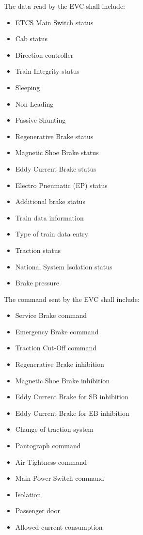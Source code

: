\documentclass{template/openetcs_article}
\begin{document}
		The data read by the EVC shall include:
		\begin{itemize}
			\item ETCS Main Switch status
			\item Cab status
			\item Direction controller
			\item Train Integrity status
			\item Sleeping
			\item Non Leading
			\item Passive Shunting
			\item Regenerative Brake status
			\item Magnetic Shoe Brake status
			\item Eddy Current Brake status
			\item Electro Pneumatic (EP) status
			\item Additional brake status
			\item Train data information
			\item Type of train data entry
			\item Traction status
			\item National System Isolation status
			\item Brake pressure
		\end{itemize}
		
		The command sent by the EVC shall include:
		\begin{itemize}
			\item Service Brake command
			\item Emergency Brake command
			\item Traction Cut-Off command
			\item Regenerative Brake inhibition
			\item Magnetic Shoe Brake inhibition
			\item Eddy Current Brake for SB inhibition
			\item Eddy Current Brake for EB inhibition
			\item Change of traction system
			\item Pantograph command
			\item Air Tightness command
			\item Main Power Switch command
			\item Isolation 
			\item Passenger door
			\item Allowed current consumption				
		\end{itemize}						
\end{document}
